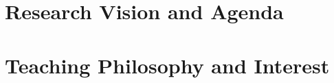\author{Yuyang Wang}
\date{\vspace{-7ex}}
\makeatletter
\fancyfoot[L]{\scshape \MakeLowercase{\@author}}
\fancyfoot[R]{{\scshape \MakeLowercase{\@title}}\quad{\LARGE\sfrac{\thepage}{\pageref*{LastPage}}}}
\makeatother



\maketitle%
\thispagestyle{fancy}

\part{Research Vision and Agenda}



{\scriptsize
    
}

\part{Teaching Philosophy and Interest}


\rsCustom{}

